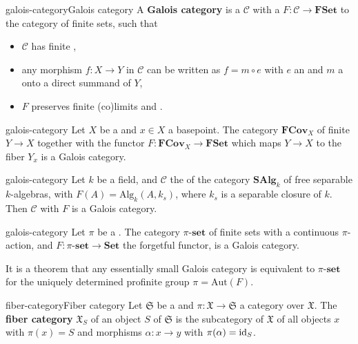 \begin{topic}{galois-category}{Galois category}
    A \textbf{Galois category} is a  $\mathcal{C}$ with a  $F : \mathcal{C} \to \textbf{FSet}$ to the category of finite sets, such that
    \begin{itemize}
        \item $\mathcal{C}$ has finite ,
        \item any morphism $f : X \to Y$ in $\mathcal{C}$ can be written as $f = m \circ e$ with $e$ an  and $m$ a  onto a direct summand of $Y$,
        \item $F$ preserves finite (co)limits and .
    \end{itemize}
\end{topic}

\begin{example}{galois-category}
    Let $X$ be a   and $x \in X$ a basepoint. The category $\textbf{FCov}_X$ of finite  $Y \to X$ together with the functor $F : \textbf{FCov}_X \to \textbf{FSet}$ which maps $Y \to X$ to the fiber $Y_x$ is a Galois category.
\end{example}

\begin{example}{galois-category}
    Let $k$ be a field, and $\mathcal{C}$ the  of the category $\textbf{SAlg}_k$ of free separable $k$-algebras, with $F(A) = \text{Alg}_k(A, k_s)$, where $k_s$ is a separable closure of $k$. Then $\mathcal{C}$ with $F$ is a Galois category.
\end{example}

\begin{example}{galois-category}
    Let $\pi$ be a . The category $\pi\text{-}\textbf{set}$ of finite sets with a continuous $\pi$-action, and $F : \pi\text{-}\textbf{set} \to \textbf{Set}$ the forgetful functor, is a Galois category.
    
    It is a theorem that any essentially small Galois category is equivalent to $\pi\text{-}\textbf{set}$ for the uniquely determined profinite group $\pi = \text{Aut}(F)$.
\end{example}

\begin{topic}{fiber-category}{Fiber category}
    Let $\mathfrak{S}$ be a  and $\pi : \mathfrak{X} \to \mathfrak{S}$ a category over $\mathfrak{X}$. The \textbf{fiber category} $\mathfrak{X}_S$ of an object $S$ of $\mathfrak{S}$ is the subcategory of $\mathfrak{X}$ of all objects $x$ with $\pi(x) = S$ and morphisms $\alpha : x \to y$ with $\pi(\alpha) = \text{id}_S$.
\end{topic}

